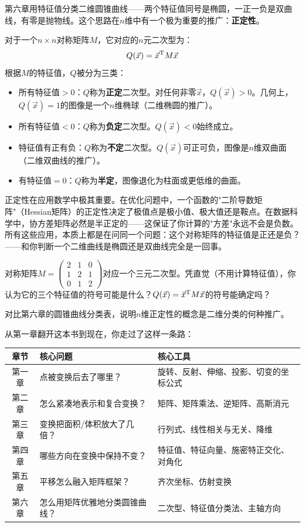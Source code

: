 
第六章用特征值分类二维圆锥曲线——两个特征值同号是椭圆，一正一负是双曲线，有零是抛物线。这个思路在$n$维中有一个极为重要的推广：\textbf{正定性}。

对于一个$n\times n$对称矩阵$M$，它对应的$n$元二次型为：
\[
Q(\vec x) = \vec x^{\text T} M \vec x
\]
根据$M$的特征值，$Q$被分为三类：
\begin{itemize}
\item 所有特征值$>0$：$Q$称为\textbf{正定}二次型。对任何非零$\vec x$，$Q(\vec x)>0$。几何上，$Q(\vec x)=1$的图像是一个$n$维椭球（二维椭圆的推广）。
\item 所有特征值$<0$：$Q$称为\textbf{负定}二次型。$Q(\vec x)<0$始终成立。
\item 特征值有正有负：$Q$称为\textbf{不定}二次型。$Q(\vec x)$可正可负，图像是$n$维双曲面（二维双曲线的推广）。
\item 有特征值$=0$：$Q$称为\textbf{半定}，图像退化为柱面或更低维的曲面。
\end{itemize}

正定性在应用数学中极其重要。在优化问题中，一个函数的"二阶导数矩阵"（Hessian矩阵）的正定性决定了极值点是极小值、极大值还是鞍点。在数据科学中，协方差矩阵必然是半正定的——这保证了你计算的"方差"永远不会是负数。所有这些应用，本质上都是在问同一个问题：这个对称矩阵的特征值是正还是负？——和你判断一个二维曲线是椭圆还是双曲线完全是一回事。

\begin{exercise}
\item 对称矩阵$M=\begin{pmatrix}2&1&0\\1&2&1\\0&1&2\end{pmatrix}$对应一个三元二次型。凭直觉（不用计算特征值），你认为它的三个特征值的符号可能是什么？$Q(\vec x)=\vec x^{\text T}M\vec x$的符号能确定吗？
\item 对比第六章的圆锥曲线分类表，说明$n$维正定性的概念是二维分类的何种推广。
\end{exercise}


从第一章翻开这本书到现在，你走过了这样一条路：

\begin{center}
\begin{tabular}{c|l|l}
\textbf{章节} & \textbf{核心问题} & \textbf{核心工具}\\\hline
第一章 & 点被变换后去了哪里？ & 旋转、反射、伸缩、投影、切变的坐标公式\\
第二章 & 怎么紧凑地表示和复合变换？ & 矩阵、矩阵乘法、逆矩阵、高斯消元\\
第三章 & 变换把面积/体积放大了几倍？ & 行列式、线性相关与无关、降维\\
第四章 & 哪些方向在变换中保持不变？ & 特征值、特征向量、施密特正交化、对角化\\
第五章 & 平移怎么融入矩阵框架？ & 齐次坐标、仿射变换\\
第六章 & 怎么用矩阵优雅地分类圆锥曲线？ & 二次型、特征值分类法、主轴方向\\
\end{tabular}
\end{center}

